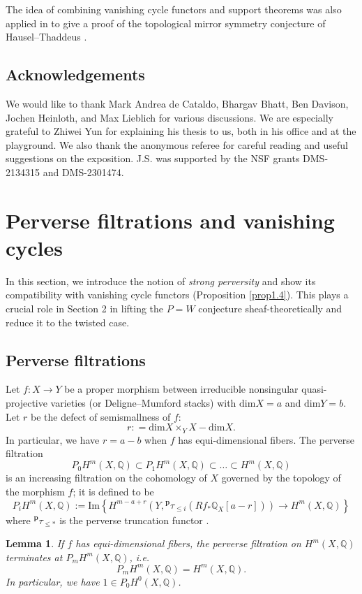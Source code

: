 \documentclass[11pt]{amsart}
\theoremstyle{plain}
\newtheorem{lem}[thm]{Lemma}
\theoremstyle{definition}
\theoremstyle{remark}
\newcommand{\BQ}{{\mathbb{Q}}}
\begin{document}
The idea of combining vanishing cycle functors and support theorems was also applied in \cite{MS} to give a proof of the topological mirror symmetry conjecture of Hausel--Thaddeus \cite{HT, GWZ}.

\subsection{Acknowledgements}
We would like to thank Mark Andrea de Cataldo, Bhargav Bhatt, Ben Davison, Jochen Heinloth, and Max Lieblich for various discussions.  We are especially grateful to Zhiwei Yun for explaining his thesis to us, both in his office and at the playground.  We also thank the anonymous referee for careful
reading and useful suggestions on the exposition. J.S. was supported by the NSF grants DMS-2134315 and DMS-2301474. 



\section{Perverse filtrations and vanishing cycles}

In this section, we introduce the notion of \emph{strong perversity} and show its compatibility with vanishing cycle functors (Proposition \ref{prop1.4}). This plays a crucial role in Section 2 in lifting the $P=W$ conjecture sheaf-theoretically and reduce it to the twisted case.

\subsection{Perverse filtrations}\label{sec1.1}
Let $f: X \to Y$ be a proper morphism between irreducible nonsingular quasi-projective varieties (or Deligne--Mumford stacks) with $\mathrm{dim}X = a$ and $\mathrm{dim}Y = b$. Let $r$ be the defect of semismallness of $f$:
\[
r: = \mathrm{dim} X \times_YX - \mathrm{dim}X.
\]
In particular, we have $r = a-b$ when $f$ has equi-dimensional fibers. The perverse filtration 
\[
P_0H^m(X, \BQ) \subset P_1H^m(X, \BQ) \subset \dots \subset H^m(X, \BQ)
\]
is an increasing filtration on the cohomology of $X$ governed by the topology of the morphism $f$; it is defined to be
\[
P_iH^m(X, \BQ) := \mathrm{Im}\left\{ H^{m-a+r}(Y, {^\mathbf{p}\tau_{\leq i}} (Rf_* \BQ_X[a-r])) \to H^m(X, \BQ)\right\}
\]
where $^\mathbf{p}\tau_{\leq * }$ is the perverse truncation functor \cite{BBD}. 

\begin{lem}\label{lem0}
If $f$ has equi-dimensional fibers, the perverse filtration on $H^m(X,\BQ)$ terminates at $P_mH^m(X, \BQ)$, \emph{i.e.}
\[
P_mH^m(X, \BQ) = H^m(X, \BQ).
\]
In particular, we have $1 \in P_0H^0(X, \BQ)$.
\end{lem}
\end{document}
